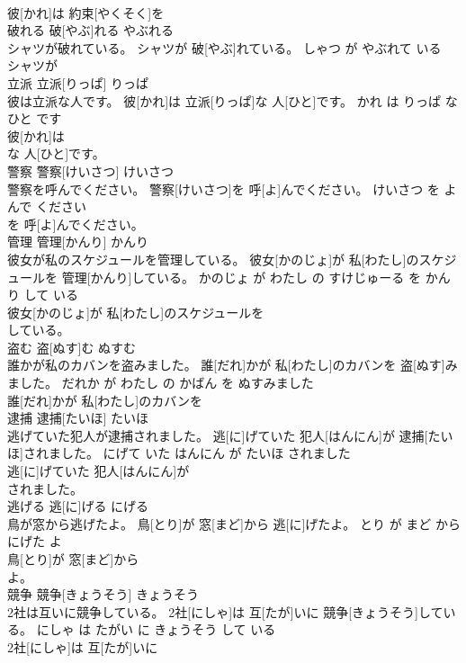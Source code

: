 \documentclass[8pt]{extreport}
\begin{document}
\begin{CJK}{UTF8}{min}
\\	彼[かれ]は 約束[やくそく]を
\\	破れる	破[やぶ]れる	やぶれる	
\\	シャツが破れている。	シャツが 破[やぶ]れている。	しゃつ が やぶれて いる	
\\	シャツが
\\	立派	立派[りっぱ]	りっぱ	
\\	彼は立派な人です。	彼[かれ]は 立派[りっぱ]な 人[ひと]です。	かれ は りっぱ な ひと です	
\\	彼[かれ]は
\\	な 人[ひと]です。			
\\	警察	警察[けいさつ]	けいさつ	
\\	警察を呼んでください。	警察[けいさつ]を 呼[よ]んでください。	けいさつ を よんで ください	
\\	を 呼[よ]んでください。			
\\	管理	管理[かんり]	かんり	
\\	彼女が私のスケジュールを管理している。	彼女[かのじょ]が 私[わたし]のスケジュールを 管理[かんり]している。	かのじょ が わたし の すけじゅーる を かんり して いる	
\\	彼女[かのじょ]が 私[わたし]のスケジュールを
\\	している。			
\\	盗む	盗[ぬす]む	ぬすむ	
\\	誰かが私のカバンを盗みました。	誰[だれ]かが 私[わたし]のカバンを 盗[ぬす]みました。	だれか が わたし の かばん を ぬすみました	
\\	誰[だれ]かが 私[わたし]のカバンを
\\	逮捕	逮捕[たいほ]	たいほ	
\\	逃げていた犯人が逮捕されました。	逃[に]げていた 犯人[はんにん]が 逮捕[たいほ]されました。	にげて いた はんにん が たいほ されました	
\\	逃[に]げていた 犯人[はんにん]が
\\	されました。			
\\	逃げる	逃[に]げる	にげる	
\\	鳥が窓から逃げたよ。	鳥[とり]が 窓[まど]から 逃[に]げたよ。	とり が まど から にげた よ	
\\	鳥[とり]が 窓[まど]から
\\	よ。			
\\	競争	競争[きょうそう]	きょうそう	
\\	2社は互いに競争している。	2社[にしゃ]は 互[たが]いに 競争[きょうそう]している。	にしゃ は たがい に きょうそう して いる	
\\	2社[にしゃ]は 互[たが]いに

\end{CJK}
\end{document}
